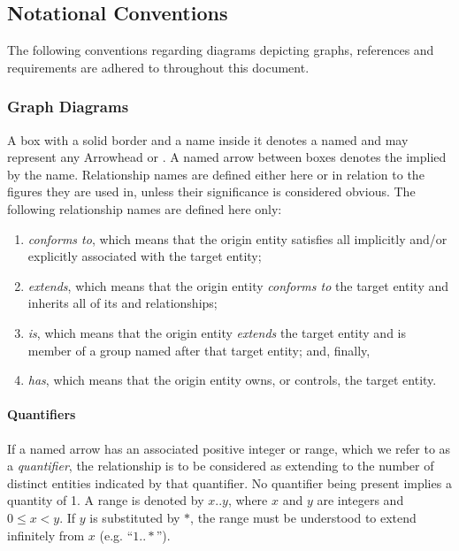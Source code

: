 \subsection{Notational Conventions}
\label{sec:introduction:conventions}

The following conventions regarding diagrams depicting graphs, references and requirements are adhered to throughout this document.

\subsubsection{Graph Diagrams}

A box with a solid border and a name inside it denotes a named  and may represent any Arrowhead  or .
A named arrow between boxes denotes the  implied by the name.
Relationship names are defined either here or in relation to the figures they are used in, unless their significance is considered obvious.
The following relationship names are defined here only:

\begin{enumerate}
\item \textit{conforms to}, which means that the origin entity satisfies all  implicitly and/or explicitly associated with the target entity;
\item \textit{extends}, which means that the origin entity \textit{conforms to} the target entity and inherits all of its  and relationships;
\item \textit{is}, which means that the origin entity \textit{extends} the target entity and is member of a group named after that target entity; and, finally,
\item \textit{has}, which means that the origin entity owns, or controls, the target entity.
\end{enumerate}

\paragraph{Quantifiers}
If a named arrow has an associated positive integer or range, which we refer to as a \textit{quantifier}, the relationship is to be considered as extending to the number of distinct entities indicated by that quantifier.
No quantifier being present implies a quantity of 1.
A range is denoted by $x..y$, where $x$ and $y$ are integers and $0 \leq x < y$.
If $y$ is substituted by $*$, the range must be understood to extend infinitely from $x$ (e.g. ``$1..*$'').

